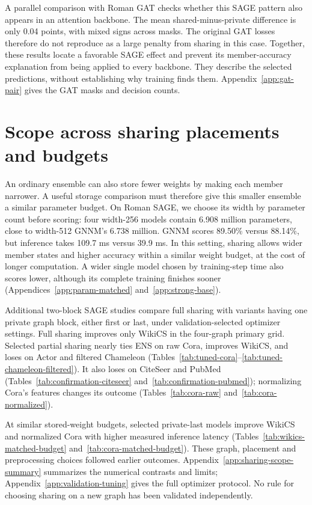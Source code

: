 \documentclass{article}
\begin{document}
A parallel comparison with Roman GAT checks whether this SAGE pattern also appears in an attention backbone. The mean shared-minus-private difference is only 0.04 points, with mixed signs across masks. The original GAT losses therefore do not reproduce as a large penalty from sharing in this case. Together, these results locate a favorable SAGE effect and prevent its member-accuracy explanation from being applied to every backbone. They describe the selected predictions, without establishing why training finds them. Appendix~\ref{app:gat-pair} gives the GAT masks and decision counts.




\section{Scope across sharing placements and budgets}\label{sec:additional}
An ordinary ensemble can also store fewer weights by making each member narrower. A useful storage comparison must therefore give this smaller ensemble a similar parameter budget. On Roman SAGE, we choose its width by parameter count before scoring: four width-256 models contain 6.908 million parameters, close to width-512 GNNM's 6.738 million. GNNM scores 89.50\% versus 88.14\%, but inference takes 109.7 ms versus 39.9 ms. In this setting, sharing allows wider member states and higher accuracy within a similar weight budget, at the cost of longer computation. A wider single model chosen by training-step time also scores lower, although its complete training finishes sooner (Appendices~\ref{app:param-matched} and~\ref{app:strong-base}).

Additional two-block SAGE studies compare full sharing with variants having one private graph block, either first or last, under validation-selected optimizer settings. Full sharing improves only WikiCS in the four-graph primary grid. Selected partial sharing nearly ties ENS on raw Cora, improves WikiCS, and loses on Actor and filtered Chameleon (Tables~\ref{tab:tuned-cora}--\ref{tab:tuned-chameleon-filtered}). It also loses on CiteSeer and PubMed (Tables~\ref{tab:confirmation-citeseer} and~\ref{tab:confirmation-pubmed}); normalizing Cora's features changes its outcome (Tables~\ref{tab:cora-raw} and~\ref{tab:cora-normalized}).

At similar stored-weight budgets, selected private-last models improve WikiCS and normalized Cora with higher measured inference latency (Tables~\ref{tab:wikics-matched-budget} and~\ref{tab:cora-matched-budget}). These graph, placement and preprocessing choices followed earlier outcomes. Appendix~\ref{app:sharing-scope-summary} summarizes the numerical contrasts and limits; Appendix~\ref{app:validation-tuning} gives the full optimizer protocol. No rule for choosing sharing on a new graph has been validated independently.
\end{document}
